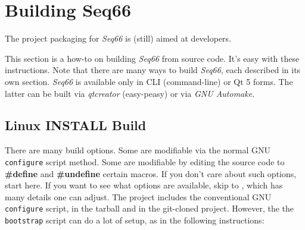%
%
%

\section{Building Seq66}
\label{sec:build}

   The project packaging for \textsl{Seq66}
   is (still) aimed at developers.

   This section is a how-to on building
   \textsl{Seq66} from source code.  It's easy with
   these instructions. Note that there are many ways to build
   \textsl{Seq66}, each described in its own section.
   \textsl{Seq66} is available only in CLI (command-line) or Qt 5 forms.
   The latter can be built via \textsl{qtcreator} (easy-peasy)
   or via \textsl{GNU Automake}.

\subsection{Linux INSTALL Build}
\label{subsec:build_install}

   There are many build options.  Some are modifiable via the normal GNU
   \texttt{configure} script method.  Some are modifiable by
   editing the source code to \textbf{\#define} and \textbf{\#undefine} certain
   macros.  If you don't care about such options, start here.
   If you want to see what options are available, skip to
   , which has many details one can
   adjust.
   The project includes the conventional GNU \texttt{configure} script, in the
   tarball and in the git-cloned project.  However, the
   the \texttt{bootstrap} script can do a lot of setup,
   as in the following instructions:

